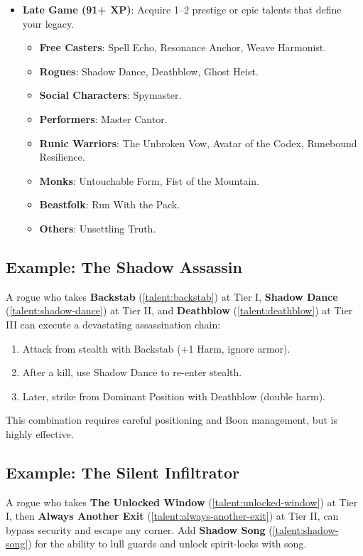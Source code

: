 \documentclass[12pt,a4paper]{book}
\begin{document}
\begin{itemize}
\begin{itemize}
  \item \textbf{Runic Warriors}: Take Engraved Defense and Shared Burden.
  \item \textbf{Commanders}: Take Delegated Upkeep.
  \item \textbf{Dragonfolk}: Take Draconic Breath (if Tier II+).
  \end{itemize}
  \item \textbf{Late Game (91+ XP)}: Acquire 1--2 prestige or epic talents that define your legacy.
  \begin{itemize}
  \item \textbf{Free Casters}: Spell Echo, Resonance Anchor, Weave Harmonist.
  \item \textbf{Rogues}: Shadow Dance, Deathblow, Ghost Heist.
  \item \textbf{Social Characters}: Spymaster.
  \item \textbf{Performers}: Master Cantor.
  \item \textbf{Runic Warriors}: The Unbroken Vow, Avatar of the Codex, Runebound Resilience.
  \item \textbf{Monks}: Untouchable Form, Fist of the Mountain.
  \item \textbf{Beastfolk}: Run With the Pack.
  \item \textbf{Others}: Unsettling Truth.
  \end{itemize}
\end{itemize}

\subsection*{Example: The Shadow Assassin}
\label{sec:shadow-assassin-example}
A rogue who takes \textbf{Backstab} (\ref{talent:backstab}) at Tier I, \textbf{Shadow Dance} (\ref{talent:shadow-dance}) at Tier II, and \textbf{Deathblow} (\ref{talent:deathblow}) at Tier III can execute a devastating assassination chain:
\begin{enumerate}
\item Attack from stealth with Backstab (+1 Harm, ignore armor).
\item After a kill, use Shadow Dance to re-enter stealth.
\item Later, strike from Dominant Position with Deathblow (double harm).
\end{enumerate}
This combination requires careful positioning and Boon management, but is highly effective.

\subsection*{Example: The Silent Infiltrator}
\label{sec:silent-infiltrator-example}
A rogue who takes \textbf{The Unlocked Window} (\ref{talent:unlocked-window}) at Tier I, then \textbf{Always Another Exit} (\ref{talent:always-another-exit}) at Tier II, can bypass security and escape any corner. Add \textbf{Shadow Song} (\ref{talent:shadow-song}) for the ability to lull guards and unlock spirit-locks with song.
\end{document}
